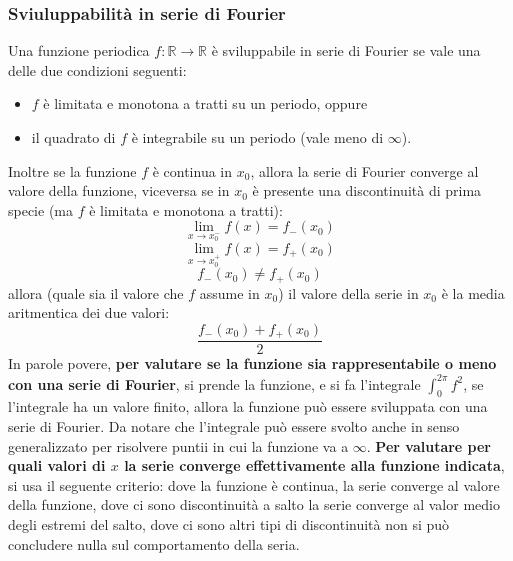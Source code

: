 \subsubsection{Sviuluppabilità in serie di Fourier}
Una funzione periodica $f: \mathbb{R} \rightarrow  \mathbb{R}$ è sviluppabile in serie di Fourier se vale una delle due condizioni seguenti:
\begin{itemize}
    \item $f$ è limitata e monotona a tratti su un periodo, oppure
    \item il quadrato di $f$ è integrabile su un periodo (vale meno di $\infty$).
\end{itemize}
Inoltre se la funzione $f$ è continua in $x_0$, allora la serie di Fourier converge al valore della funzione, viceversa se in $x_0$ è presente una discontinuità di prima specie (ma $f$ è limitata e monotona a tratti):
\[
    \lim_{x\rightarrow x_0^-} f(x) = f_-(x_0)
\]
\[
    \lim_{x\rightarrow x_0^+} f(x) = f_+(x_0)
\]
\[
    f_-(x_0) \neq f_+(x_0)
\]
allora (quale sia il valore che $f$ assume in $x_0$) il valore della serie in $x_0$ è la media aritmentica dei due valori:
\[
    \frac{f_-(x_0) + f_+(x_0)}{2}
\]
\newline
In parole povere, \textbf{per valutare se la funzione sia rappresentabile o meno con una serie di Fourier}, si prende la funzione, e si fa l'integrale $\int_{0}^{2\pi} f^2$, se l'integrale ha un valore finito, allora la funzione può essere sviluppata con una serie di Fourier. Da notare che l'integrale può essere svolto anche in senso generalizzato per risolvere puntii in cui la funzione va a $\infty$.\newline
\textbf{Per valutare per quali valori di $x$ la serie converge effettivamente alla funzione indicata}, si usa il seguente criterio: dove la funzione è continua, la serie converge al valore della funzione, dove ci sono discontinuità a salto la serie converge al valor medio degli estremi del salto, dove ci sono altri tipi di discontinuità non si può concludere nulla sul comportamento della seria.
